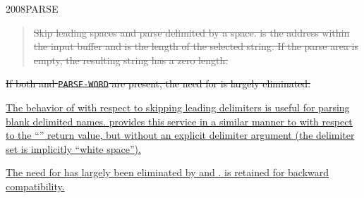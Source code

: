 \begin{worddef}{2008}{PARSE}
\begin{rationale}
\begin{enumerate}
\begin{quote}
\sout{%
				Skip leading spaces and parse  delimited by
				a space.  is the address within the input
				buffer and  is the length of the selected string.
				If the parse area is empty, the resulting string has a
				zero length.}
			\end{quote}

\sout{%
			If both  and \texttt{PARSE-WORD} are present,
			the need for  is largely eliminated.}

\uline{%
			The behavior of  with respect to skipping leading
			delimiters is useful for parsing blank delimited names.
			 provides this service in a similar manner to
			 with respect to the ``}\uline{'' return value,
			but without an explicit delimiter argument (the delimiter set is
			implicitly ``white space'').}

\uline{%
			The need for  has largely been eliminated by
			 and .  is
			\linebreak
			retained for backward compatibility.}
\cbend
		\end{enumerate}
	\end{rationale}
\end{worddef}


